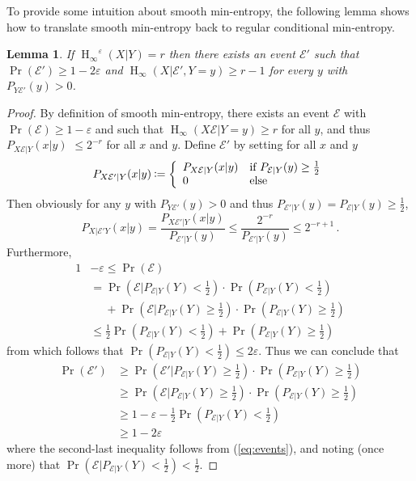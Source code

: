 \documentclass[final,11pt,a4paper]{report}
\newtheorem{lemma}[theorem]{Lemma}
\newcommand*{\assign}{\ensuremath{\kern.5ex\raisebox{.1ex}{\mbox{\rm:}}\kern -.3em =}}
\renewcommand*{\H}{\operatorname{H}}   %
\newcommand*{\hmin}{\ensuremath{\H_{\infty}}}
\newcommand*{\hie}[2]{\ensuremath{\hmin^{#1}(#2)}}
\newcommand*{\hiee}[1]{\hie{\varepsilon}{#1}}
\newcommand*{\ev}{\ensuremath{\mathcal{E}}\xspace} %
\begin{document}
To provide some intuition about smooth min-entropy, the following lemma shows how to translate smooth min-entropy
back to regular conditional min-entropy.
\begin{lemma}\label{lemma:smooth->ordinary}
  If $\hiee{X|Y} = r$ then there exists an event $\ev'$ such that
  $\Pr(\ev') \geq 1-2\varepsilon$ and $\hmin(X|\ev',Y\!=\!y) \geq r-1$
  for every $y$ with $P_{Y \ev'}(y) > 0$.
\end{lemma}
\begin{proof}
By definition of smooth min-entropy, there exists an event $\ev$ with
$\Pr(\ev) \geq 1 - \varepsilon$ and such that $\mbox{$\hmin(X\ev|Y\!=\!y)$}
\geq r$ for all $y$, and thus $P_{X\ev|Y}(x|y)$ $\leq 2^{-r}$ for all
$x$ and $y$.  Define $\ev'$ by setting for all $x$ and $y$
$$
P_{X\ev'|Y}(x|y) \assign \left\{
\begin{array}{ll}
P_{X\ev|Y}(x|y) & \text{if $P_{\ev|Y}(y) \geq \frac12$} \\
0 & \text{else}
\end{array}
\right.
$$
Then obviously for any $y$ with $P_{Y \ev'}(y) > 0$ and thus
$P_{\ev'|Y}(y) = P_{\ev|Y}(y) \geq \frac12$,
$$
P_{X|\ev'Y}(x|y) = \frac{P_{X\ev'|Y}(x|y)}{P_{\ev'|Y}(y)} \leq
\frac{2^{-r}}{P_{\ev'|Y}(y)} \leq 2^{-r+1} \, .
$$
Furthermore, 
\begin{align}
  1 &- \varepsilon \leq \Pr(\ev)  \nonumber \\[0.7ex]
  &= \Pr(\ev|P_{\ev|Y}(Y)<{\textstyle\frac12})\cdot\Pr(P_{\ev|Y}(Y)<{\textstyle\frac12}) \nonumber \\
 &\quad\; +
  \Pr(\ev|P_{\ev|Y}(Y)\geq{\textstyle\frac12})\cdot\Pr(P_{\ev|Y}(Y)\geq{\textstyle\frac12}) \label{eq:events}\\
  &\leq \frac{1}{2}\Pr(P_{\ev|Y}(Y)<{\textstyle\frac12}) +
  \Pr(P_{\ev|Y}(Y)\geq{\textstyle\frac12}) \nonumber
\end{align}
from which follows that $\Pr(P_{\ev|Y}(Y)<{\textstyle\frac12}) \leq
2\varepsilon$. Thus we can conclude that
\begin{align*}
\Pr(\ev') &\geq \Pr(\ev'|P_{\ev|Y}(Y)\geq{\textstyle\frac12})\cdot\Pr(P_{\ev|Y}(Y)\geq{\textstyle\frac12}) \\ 
&\geq \Pr(\ev|P_{\ev|Y}(Y)\geq{\textstyle\frac12})\cdot\Pr(P_{\ev|Y}(Y)\geq{\textstyle\frac12}) \\ 
&\geq 1 - \varepsilon - \frac{1}{2}\Pr(P_{\ev|Y}(Y)<{\textstyle\frac12}) \\
&\geq 1 - 2\varepsilon
\end{align*} 
where the second-last inequality follows from (\ref{eq:events}), and noting (once more) that $\Pr(\ev|P_{\ev|Y}(Y)<{\textstyle\frac12}) < \frac12$. 
\end{proof}
\end{document}
